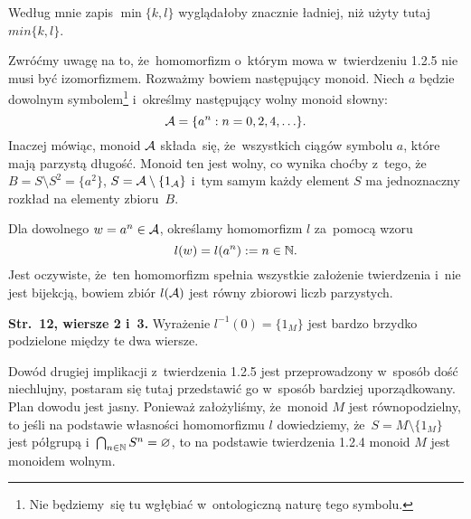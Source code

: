 \documentclass[a4paper,11pt]{article}
\begin{document}
\start {} Według mnie zapis $\min\{ k, l \}$ wyglądałoby
znacznie ładniej, niż użyty tutaj $min\{ k, l \}$.

\vspace{\spaceFour}





\start {} Zwróćmy uwagę na to, że~homomorfizm o~którym mowa
w~twierdzeniu 1.2.5 nie musi być izomorfizmem. Rozważmy bowiem
następujący monoid. Niech $a$ będzie dowolnym symbolem\footnote{Nie
  będziemy~się tu wgłębiać w~ontologiczną naturę tego symbolu.}
i~określmy następujący wolny monoid słowny:
\begin{equation}
  \label{eq:Forys-Forys-53}
  \mathcal{A} = \{ a^{ n } : n = 0, 2, 4, \ldots \}.
\end{equation}
Inaczej mówiąc, monoid $\mathcal{A}$ składa~się, że~wszystkich ciągów
symbolu $a$, które mają parzystą długość. Monoid ten jest wolny, co
wynika choćby z~tego, że~$B = S \setminus S^{ 2 } = \{ a^{ 2 } \}$,
$S = \mathcal{A} \setminus \{ 1_{ \mathcal{A} } \}$ i~tym samym każdy element $S$
ma jednoznaczny rozkład na elementy zbioru~$B$.

Dla dowolnego $w = a^{ n } \in \mathcal{A}$, określamy homomorfizm $l$
za~pomocą wzoru
\begin{equation}
  \label{eq:Forys-Forys-54}
  l( w ) = l( a^{ n } ) := n \in \mathbb{N}.
\end{equation}
Jest oczywiste, że~ten homomorfizm spełnia wszystkie założenie
twierdzenia i~nie jest bijekcją, bowiem zbiór $l( \mathcal{A} )$ jest równy
zbiorowi liczb parzystych.

\vspace{\spaceFour}





\start \textbf{Str.~12, wiersze 2 i~3.} Wyrażenie
$l^{ -1 }( 0 ) = \{ 1_{ M } \}$ jest bardzo brzydko podzielone między
te dwa wiersze.

\vspace{\spaceFour}





\start {} Dowód drugiej implikacji z~twierdzenia 1.2.5 jest
przeprowadzony w~sposób dość niechlujny, postaram się tutaj
przedstawić go w~sposób bardziej uporządkowany. Plan dowodu jest
jasny. Ponieważ założyliśmy, że~monoid $M$ jest równopodzielny, to
jeśli na podstawie własności homomorfizmu $l$ dowiedziemy,
że~$S = M \setminus \{ 1_{ M } \}$ jest półgrupą
i~$\bigcap_{ n \in \mathbb{N} } S^{ n } = \varnothing$, to na podstawie
twierdzenia 1.2.4 monoid $M$ jest monoidem wolnym.
\end{document}
